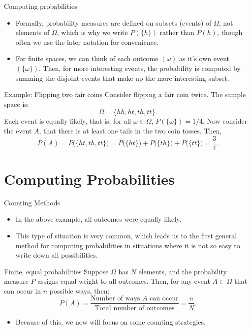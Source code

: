 \begin{frame}[allowframebreaks]{Computing probabilities}

  \begin{itemize}
    \item Formally, probability measures are defined on subsets (events) of $\Omega$, not elements of $\Omega$, which is why we write $P(\{h\})$ rather than $P(h)$, though often we use the later notation for convenience.
    \item For finite spaces, we can think of each outcome $(\omega)$ as it's own event $(\{\omega\})$. Then, for more interesting events, the probability is computed by summing the disjoint events that make up the more interesting subset.
  \end{itemize}
  
  \begin{exampleblock}{Example: Flipping two fair coins}
    Consider flipping a fair coin twice. The sample space is:
    $$
    \Omega = \{hh, ht, th, tt\}.
    $$
    Each event is equally likely, that is, for all $\omega \in \Omega$, $P(\{\omega\}) = 1/4$. Now consider the event $A$, that there is at least one tails in the two coin tosses. Then, 
    $$
    P(A) = P\big(\{ht, th, tt\}\big) = P\big(\{ht\}\big) + P\big(\{th\}\big) + P\big(\{tt\}\big) = \frac{3}{4}.
    $$
  \end{exampleblock}
\end{frame}

\section{Computing Probabilities}

\begin{frame}[allowframebreaks]{Counting Methods}

  \begin{itemize}
    \item In the above example, all outcomes were equally likely. 
    \item This type of situation is very common, which leads us to the first general method for computing probabilities in situations where it is not so easy to write down all possibilities.
  \end{itemize}
  \begin{block}{Finite, equal probabilities}
    Suppose $\Omega$ has $N$ elements, and the probability measure $P$ assigns equal weight to all outcomes. Then, for any event $A \subset \Omega$ that can occur in $n$ possible ways, then:
    $$
    P(A) = \frac{\text{Number of ways } A \text{ can occur}}{\text{Total number of outcomes}} = \frac{n}{N}.
    $$
  \end{block}
  
  \begin{itemize}
    \item Because of this, we now will focus on some counting strategies.
  \end{itemize}
  
\end{frame}

